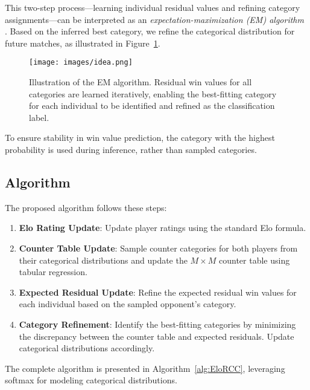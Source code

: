 This two-step process—learning individual residual values and refining category assignments—can be interpreted as an \textit{expectation-maximization (EM) algorithm} \citep{em_algorithm}. Based on the inferred best category, we refine the categorical distribution for future matches, as illustrated in Figure~\ref{figure:idea}.

\begin{figure}[t]
    \centering
    \texttt{[image: images/idea.png]}
    \caption{Illustration of the EM algorithm. Residual win values for all categories are learned iteratively, enabling the best-fitting category for each individual to be identified and refined as the classification label.}
    \label{figure:idea}
\end{figure}

To ensure stability in win value prediction, the category with the highest probability is used during inference, rather than sampled categories.

\subsection{Algorithm}

The proposed algorithm follows these steps:
\begin{enumerate}
    \item \textbf{Elo Rating Update}: Update player ratings using the standard Elo formula.
    \item \textbf{Counter Table Update}: Sample counter categories for both players from their categorical distributions and update the $M \times M$ counter table using tabular regression.
    \item \textbf{Expected Residual Update}: Refine the expected residual win values for each individual based on the sampled opponent's category.
    \item \textbf{Category Refinement}: Identify the best-fitting categories by minimizing the discrepancy between the counter table and expected residuals. Update categorical distributions accordingly.
\end{enumerate}

The complete algorithm is presented in Algorithm~\ref{alg:EloRCC}, leveraging softmax for modeling categorical distributions.

